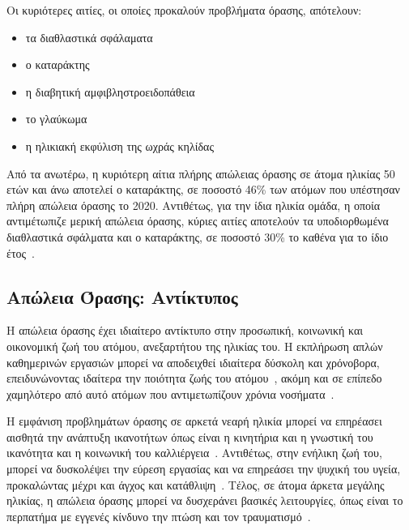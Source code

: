 Οι κυριότερες αιτίες, οι οποίες προκαλούν προβλήματα όρασης, απότελουν:
\begin{itemize}
    \item τα διαθλαστικά σφάλαματα
    \item ο καταράκτης
    \item η διαβητική αμφιβληστροειδοπάθεια
    \item το γλαύκωμα
    \item η ηλικιακή εκφύλιση της ωχράς κηλίδας
\end{itemize}
Από τα ανωτέρω, η κυριότερη αίτια πλήρης απώλειας όρασης σε άτομα ηλικίας 50 ετών και άνω αποτελεί ο καταράκτης, σε ποσοστό 46\% των ατόμων που υπέστησαν πλήρη απώλεια όρασης το 2020. Αντιθέτως, για την ίδια ηλικία ομάδα, η οποία αντιμέτωπιζε μερική απώλεια όρασης, κύριες αιτίες αποτελούν τα υποδιορθωμένα διαθλαστικά σφάλματα και ο καταράκτης, σε ποσοστό 30\% το καθένα για το ίδιο έτος~\cite{adelson_2021_causes}.

\subsection{Απώλεια Όρασης: Αντίκτυπος}\label{subsec:visionImpact}
Η απώλεια όρασης έχει ιδιαίτερο αντίκτυπο στην προσωπική, κοινωνική και οικονομική ζωή του ατόμου, ανεξαρτήτου της ηλικίας του. Η εκπλήρωση απλών καθημερινών εργασιών μπορεί να αποδειχθεί ιδιαίτερα δύσκολη και χρόνοβορα, επειδυνώνοντας ιδαίτερα την ποιότητα ζωής του ατόμου~\cite{west_2002_how}\cite{khorraminejad_2016_the}, ακόμη και σε επίπεδο χαμηλότερο από αυτό ατόμων που αντιμετωπίζουν χρόνια νοσήματα~\cite{langelaan_2007_impact}.



Η εμφάνιση προβλημάτων όρασης σε αρκετά νεαρή ηλικία μπορεί να επηρέασει αισθητά την ανάπτυξη ικανοτήτων όπως είναι η κινητήρια και η γνωστική του ικανότητα και η κοινωνική του καλλιέργεια~\cite{worldhealthorganization_2023_blindness}. Αντιθέτως, στην ενήλικη ζωή του, μπορεί να δυσκολέψει την εύρεση εργασίας και να επηρεάσει την ψυχική του υγεία, προκαλώντας μέχρι και άγχος και κατάθλιψη~\cite{khorraminejad_2016_the}. Τέλος, σε άτομα άρκετα μεγάλης ηλικίας, η απώλεια όρασης μπορεί να δυσχεράνει βασικές λειτουργίες, όπως είναι το περπατήμα με εγγενές κίνδυνο την πτώση και τον τραυματισμό~\cite{worldhealthorganization_2023_blindness}.

